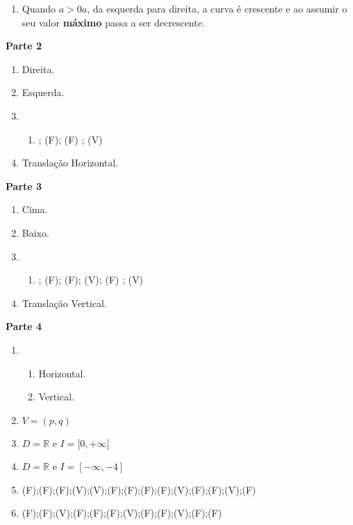 \documentclass[10 pt,usenames,dvipsnames, oneside]{article}
\begin{document}
\begin{solucao}
\begin{enumerate}
\begin{enumerate}
\item Quando $a>0a$, da esquerda para direita, a curva é crescente e ao assumir o seu valor \textbf{máximo} passa a ser decrescente.
\end{enumerate}

\end{enumerate}

\textbf{Parte 2}
\begin{enumerate}
\item {} 
Direita.

\item {} 
Esquerda.

\item {} 
\begin{enumerate}

\item {} 
; (F); (F) ; (V)

\end{enumerate}

\item {} 
Translação Horizontal.

\end{enumerate}

\textbf{Parte 3}
\begin{enumerate}
\item {} 
Cima.

\item {} 
Baixo.

\item {} \begin{enumerate}

\item {} 
; (F); (F); (V); (F) ; (V)

\end{enumerate}

\item {} 
Translação Vertical.

\end{enumerate}
\clearpage
\textbf{Parte 4}
\begin{enumerate}
\item {} 
\begin{enumerate}
\item Horizontal.
\item Vertical.
\end{enumerate}
\item {} 
\(V=(p,q)\)

\item {} 
\(D=\mathbb{R}\) e \(I=[0,+\infty[\)

\item {} 
\(D=\mathbb{R}\) e \(I=[-\infty,-4]\)

\item {} 
(F);(F);(F);(V);(V);(F);(F);(F);(F);(V);(F);(F);(V);(F)

\item {} 
(F);(F);(V);(F);(F);(F);(V);(F);(F);(V);(F);(F)

\end{enumerate}

\end{solucao}
\fi
\end{document}
